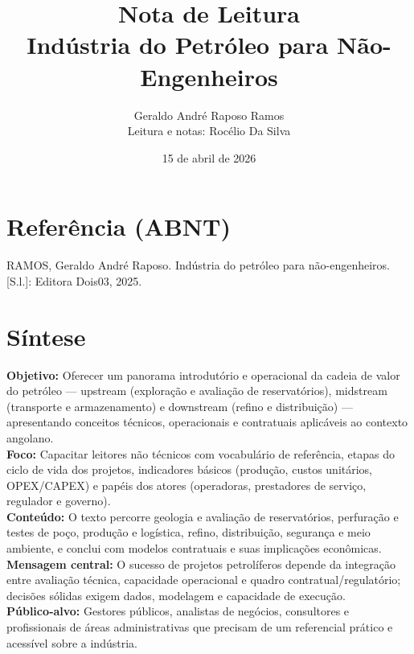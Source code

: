 \documentclass[12pt,a4paper]{article}
\title{Nota de Leitura\\\large Indústria do Petróleo para Não-Engenheiros}
\author{Geraldo André Raposo Ramos \\ \small Leitura e notas: Rocélio Da Silva}
\date{15 de abril de 2026}
\newcommand{\abntref}[1]{\par\hangindent=1.25cm #1\par}
\begin{document}
\maketitle

\section*{Referência (ABNT)}
\abntref{RAMOS, Geraldo André Raposo. Indústria do petróleo para não-engenheiros. [S.l.]: Editora Dois03, 2025.}

\section*{Síntese}
\noindent \textbf{Objetivo:} Oferecer um panorama introdutório e operacional da cadeia de valor do petróleo — upstream (exploração e avaliação de reservatórios), midstream (transporte e armazenamento) e downstream (refino e distribuição) — apresentando conceitos técnicos, operacionais e contratuais aplicáveis ao contexto angolano.\\
\noindent \textbf{Foco:} Capacitar leitores não técnicos com vocabulário de referência, etapas do ciclo de vida dos projetos, indicadores básicos (produção, custos unitários, OPEX/CAPEX) e papéis dos atores (operadoras, prestadores de serviço, regulador e governo).\\
\noindent \textbf{Conteúdo:} O texto percorre geologia e avaliação de reservatórios, perfuração e testes de poço, produção e logística, refino, distribuição, segurança e meio ambiente, e conclui com modelos contratuais e suas implicações econômicas.\\
\noindent \textbf{Mensagem central:} O sucesso de projetos petrolíferos depende da integração entre avaliação técnica, capacidade operacional e quadro contratual/regulatório; decisões sólidas exigem dados, modelagem e capacidade de execução.\\
\noindent \textbf{Público‑alvo:} Gestores públicos, analistas de negócios, consultores e profissionais de áreas administrativas que precisam de um referencial prático e acessível sobre a indústria.
\end{document}
